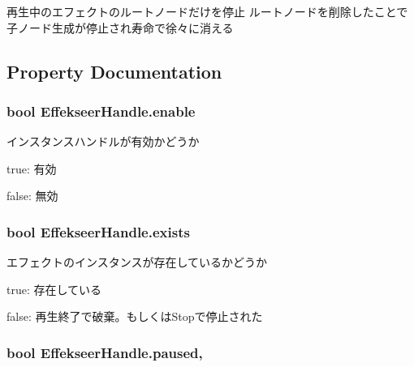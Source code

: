 再生中のエフェクトのルートノードだけを停止 ルートノードを削除したことで子ノード生成が停止され寿命で徐々に消える 



\subsection{Property Documentation}
\hypertarget{struct_effekseer_handle_a2eabd884f8b23833cbf69f3f9d9c875b}{
\subsubsection[{enable}]{\setlength{\rightskip}{0pt plus 5cm}bool Effekseer\-Handle.\-enable\hspace{0.3cm}{\ttfamily [get]}}}\label{struct_effekseer_handle_a2eabd884f8b23833cbf69f3f9d9c875b}


インスタンスハンドルが有効かどうか\par
 

true\-: 有効

false\-: 無効\hypertarget{struct_effekseer_handle_ac1d253853e6471ce1e3c951491803c27}{
\subsubsection[{exists}]{\setlength{\rightskip}{0pt plus 5cm}bool Effekseer\-Handle.\-exists\hspace{0.3cm}{\ttfamily [get]}}}\label{struct_effekseer_handle_ac1d253853e6471ce1e3c951491803c27}


エフェクトのインスタンスが存在しているかどうか 

true\-: 存在している

false\-: 再生終了で破棄。もしくは\-Stopで停止された\hypertarget{struct_effekseer_handle_a3ba9bf72308429369214fd10ebb86ca6}{
\subsubsection[{paused}]{\setlength{\rightskip}{0pt plus 5cm}bool Effekseer\-Handle.\-paused\hspace{0.3cm}{\ttfamily [get]}, {\ttfamily [set]}}}\label{struct_effekseer_handle_a3ba9bf72308429369214fd10ebb86ca6}


